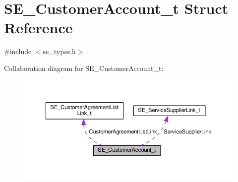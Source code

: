 \hypertarget{structSE__CustomerAccount__t}{}\section{S\+E\+\_\+\+Customer\+Account\+\_\+t Struct Reference}
\label{structSE__CustomerAccount__t}


{\ttfamily \#include $<$se\+\_\+types.\+h$>$}



Collaboration diagram for S\+E\+\_\+\+Customer\+Account\+\_\+t\+:\nopagebreak
\begin{figure}[H]
\begin{center}
\leavevmode
\includegraphics[width=350pt]{structSE__CustomerAccount__t__coll__graph}
\end{center}
\end{figure}
